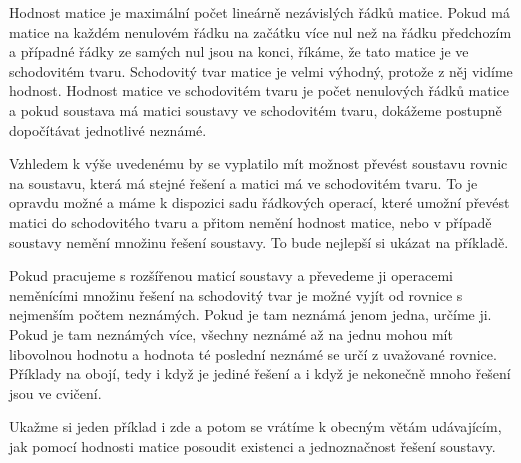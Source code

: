 \documentclass[12pt]{article}
\begin{document}
Hodnost matice je maximální počet lineárně nezávislých řádků matice. Pokud má matice na každém nenulovém řádku na začátku více nul než na řádku předchozím a případné řádky ze samých nul jsou na konci, říkáme, že tato matice je ve schodovitém tvaru. Schodovitý tvar matice je velmi výhodný, protože z něj vidíme hodnost. Hodnost matice ve schodovitém tvaru je počet nenulových řádků matice a pokud soustava má matici soustavy ve schodovitém tvaru, dokážeme postupně dopočítávat jednotlivé neznámé. 

Vzhledem k výše uvedenému by se vyplatilo mít možnost převést soustavu rovnic na soustavu, která má stejné řešení a matici má ve schodovitém tvaru. To je opravdu možné a máme k dispozici sadu řádkových operací, které umožní převést matici do schodovitého tvaru a přitom nemění hodnost matice, nebo v případě soustavy nemění množinu řešení soustavy. To bude nejlepší si ukázat na příkladě.

Pokud pracujeme s rozšířenou maticí soustavy a převedeme ji operacemi neměnícími množinu řešení na schodovitý tvar je možné vyjít od rovnice s nejmenším počtem neznámých. Pokud je tam neznámá jenom jedna, určíme ji. Pokud je tam neznámých více, všechny neznámé až na jednu mohou mít libovolnou hodnotu a hodnota té poslední neznámé se určí z uvažované rovnice. Příklady na obojí, tedy i když je jediné řešení a i když je nekonečně mnoho řešení jsou ve cvičení. 

Ukažme si jeden příklad i zde a potom se vrátíme k obecným větám udávajícím, jak pomocí hodnosti matice posoudit existenci a jednoznačnost řešení soustavy.
\end{document}
